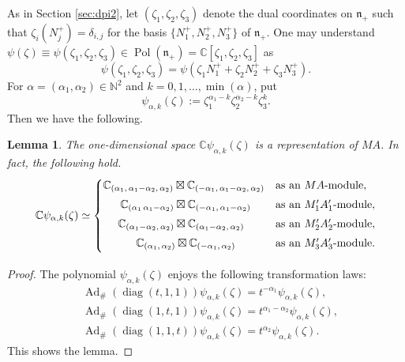 \documentclass[a4paper,11pt,reqno]{amsart}
\newcommand{\frakn}{\mathfrak{n}}
\newcommand{\NN}{\mathbb{N}}
\newcommand{\0}{{\bf 0}}
\newcommand{\C}{\mathbb{C}}
\newcommand{\1}{{\bf 1}}
\DeclareMathOperator{\Ad}{Ad}
\DeclareMathOperator{\Pol}{Pol}
\DeclareMathOperator{\diag}{diag}
\theoremstyle{plain}
\newtheorem{lemma}[equation]{Lemma}
\theoremstyle{definition}
\numberwithin{equation}{section}
\theoremstyle{definition}
\begin{document}
As in Section \ref{sec:dpi2}, let $(\zeta_1, \zeta_2, \zeta_3)$ denote
the dual coordinates on $\frakn_+$ such that $\zeta_i(N_j^+)=\delta_{i,j}$
for the basis $\{N_1^+, N_2^+, N_3^+\}$ of $\frakn_+$.
One may understand
$\psi(\zeta) \equiv \psi(\zeta_1,\zeta_2,\zeta_3) \in \Pol(\frakn_+)=\C[\zeta_1,\zeta_2,\zeta_3]$ as 
\[
\psi(\zeta_1,\zeta_2,\zeta_3)=\psi(\zeta_1N_1^++\zeta_2N_2^++\zeta_3N_3^+).
\]
For $\alpha=(\alpha_1,\alpha_2)\in \NN^2$ and 
$k = 0,1,\dots,\min(\alpha)$, put
\begin{equation}\label{eqn:q_alpha_k}
\psi_{\alpha,k}(\zeta) := \zeta_1^{\alpha_1-k}\zeta_2^{\alpha_2-k}\zeta_3^k.
\end{equation}
Then we have the following.
\begin{lemma}\label{lem:MApol}
The one-dimensional space $\C \psi_{\alpha,k}(\zeta)$ is a representation of $MA$.
In fact, the following hold.
\begin{equation*}
\C \psi_{\alpha, k}(\zeta) \simeq 
\begin{cases}
\C_{(\alpha_1,\, \alpha_1 - \alpha_2,\, \alpha_2)}
\boxtimes 
\C_{(-\alpha_1,\, \alpha_1 - \alpha_2,\, \alpha_2)} 
&\textnormal{as an $MA$-module},\\[3pt]
\hspace{15.7pt}
\C_{(\alpha_1\, \alpha_1 - \alpha_2)}
\boxtimes 
\C_{(-\alpha_1,\, \alpha_1 - \alpha_2)} 
& \textnormal{as an $M_1'A_1'$-module},\\[3pt]
\hspace{13.5pt}
\C_{(\alpha_1 - \alpha_2,\, \alpha_2)}
\boxtimes 
\C_{(\alpha_1 - \alpha_2,\, \alpha_2)} 
& \textnormal{as an $M_2'A_2'$-module},\\[3pt]
\hspace{30pt}
\C_{(\alpha_1,\, \alpha_2)} 
\boxtimes\C_{(-\alpha_1,\, \alpha_2)} & \textnormal{as an  $M_3'A_3'$-module}.\\[3pt]
\end{cases}
\end{equation*}
\end{lemma}

\begin{proof}
The polynomial $\psi_{\alpha,k}(\zeta)$ enjoys the following transformation laws:
\begin{align*}
    &\Ad_\#(\diag(t,1,1))\psi_{\alpha,k}(\zeta)=t^{-\alpha_1}\psi_{\alpha,k}(\zeta),\\[3pt]
    &\Ad_\# (\diag(1,t,1))\psi_{\alpha,k}(\zeta)=t^{\alpha_1-\alpha_2}\psi_{\alpha,k}(\zeta),\\[3pt]
    &\Ad_\#(\diag(1,1,t))\psi_{\alpha,k}(\zeta)=t^{\alpha_2}\psi_{\alpha,k}(\zeta).
\end{align*}
This shows the lemma.
\end{proof}
\end{document}
